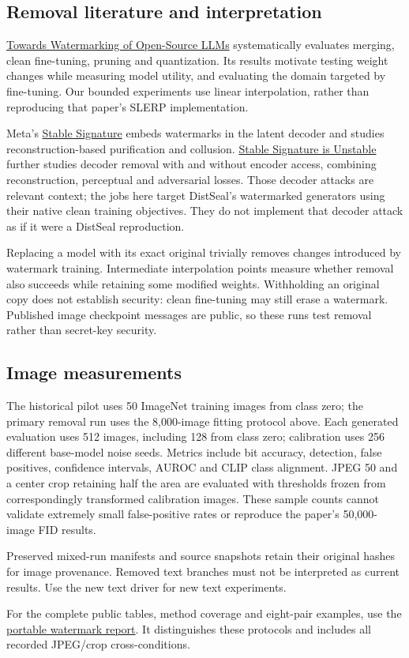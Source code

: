 \subsection{Removal literature and
interpretation}\label{record-docs-watermarking-md-removal-literature-and-interpretation}

\href{https://arxiv.org/abs/2502.10525}{Towards Watermarking of
Open-Source LLMs} systematically evaluates merging, clean fine-tuning,
pruning and quantization. Its results motivate testing weight changes
while measuring model utility, and evaluating the domain targeted by
fine-tuning. Our bounded experiments use linear interpolation, rather
than reproducing that paper's SLERP implementation.

Meta's \href{https://arxiv.org/abs/2303.15435}{Stable Signature} embeds
watermarks in the latent decoder and studies reconstruction-based
purification and collusion.
\href{https://arxiv.org/abs/2405.07145}{Stable Signature is Unstable}
further studies decoder removal with and without encoder access,
combining reconstruction, perceptual and adversarial losses. Those
decoder attacks are relevant context; the jobs here target DistSeal's
watermarked generators using their native clean training objectives.
They do not implement that decoder attack as if it were a DistSeal
reproduction.

Replacing a model with its exact original trivially removes changes
introduced by watermark training. Intermediate interpolation points
measure whether removal also succeeds while retaining some modified
weights. Withholding an original copy does not establish security: clean
fine-tuning may still erase a watermark. Published image checkpoint
messages are public, so these runs test removal rather than secret-key
security.

\subsection{Image
measurements}\label{record-docs-watermarking-md-image-measurements}

The historical pilot uses 50 ImageNet training images from class zero;
the primary removal run uses the 8,000-image fitting protocol above.
Each generated evaluation uses 512 images, including 128 from class
zero; calibration uses 256 different base-model noise seeds. Metrics
include bit accuracy, detection, false positives, confidence intervals,
AUROC and CLIP class alignment. JPEG 50 and a center crop retaining half
the area are evaluated with thresholds frozen from correspondingly
transformed calibration images. These sample counts cannot validate
extremely small false-positive rates or reproduce the paper's
50,000-image FID results.

Preserved mixed-run manifests and source snapshots retain their original
hashes for image provenance. Removed text branches must not be
interpreted as current results. Use the new text driver for new text
experiments.

For the complete public tables, method coverage and eight-pair examples,
use the \href{../docs/watermarking/README.md}{portable watermark
report}. It distinguishes these protocols and includes all recorded
JPEG/crop cross-conditions.
